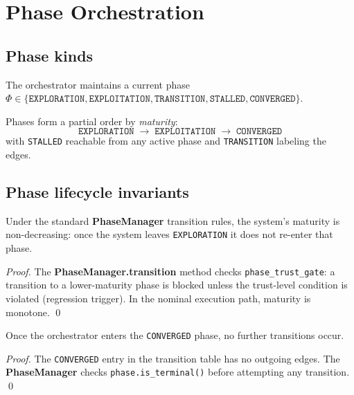\documentclass[11pt]{article}
\providecommand{\Phase}{\Phi}                  %
\begin{document}
\section{Phase Orchestration}\label{sec:phases}

\subsection{Phase kinds}

\begin{definition}\label{def:phase}
The orchestrator maintains a current phase
$\Phase \in \{\texttt{EXPLORATION}, \texttt{EXPLOITATION},
\texttt{TRANSITION}, \texttt{STALLED}, \texttt{CONVERGED}\}$.
\end{definition}

Phases form a partial order by \emph{maturity}:
\[
  \texttt{EXPLORATION} \;\to\; \texttt{EXPLOITATION} \;\to\;
  \texttt{CONVERGED}
\]
with \texttt{STALLED} reachable from any active phase and
\texttt{TRANSITION} labeling the edges.

\subsection{Phase lifecycle invariants}

\begin{proposition}\label{prop:phase-mono}
Under the standard \textbf{PhaseManager} transition rules, the
system's maturity is non-decreasing: once the system leaves
\texttt{EXPLORATION} it does not re-enter that phase.
\end{proposition}

\begin{proof}
The \textbf{PhaseManager.transition} method checks
\texttt{phase\_trust\_gate}: a transition to a lower-maturity phase
is blocked unless the trust-level condition is violated (regression
trigger).  In the nominal execution path, maturity is monotone. \qed
\end{proof}

\begin{proposition}\label{prop:converged}
Once the orchestrator enters the \texttt{CONVERGED} phase, no
further transitions occur.
\end{proposition}

\begin{proof}
The \texttt{CONVERGED} entry in the transition table has no outgoing
edges.  The \textbf{PhaseManager} checks
\texttt{phase.is\_terminal()} before attempting any transition. \qed
\end{proof}
\end{document}

